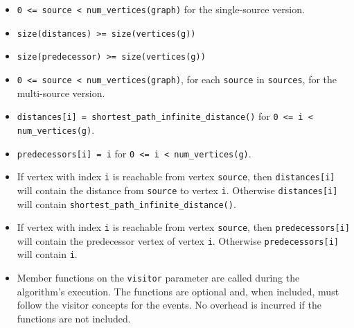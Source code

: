 \begin{itemdescr}
      \pnum\hardprecond
            \begin{itemize}
                  \item \lstinline{0 <= source < num_vertices(graph)} for the single-source version. 
                  \item \lstinline{size(distances) >= size(vertices(g))}
                  \item \lstinline{size(predecessor) >= size(vertices(g))}
            \end{itemize}
      \pnum\preconditions
            \begin{itemize}
                  \item
                        \lstinline{0 <= source < num_vertices(graph)}, for each \lstinline{source} in \lstinline{sources}, 
                        for the multi-source version.
                  \item
                        \lstinline{distances[i] = shortest_path_infinite_distance()} for \lstinline{0 <= i < num_vertices(g)}.
                  \item
                        \lstinline{predecessors[i] = i} for \lstinline{0 <= i < num_vertices(g)}.
            \end{itemize}
      \pnum\effects
            \begin{itemize}
                  \item
                        If vertex with index \lstinline{i} is reachable from vertex \lstinline{source}, then
                        \lstinline{distances[i]} will contain the distance from \lstinline{source} to vertex
                        \lstinline{i}.  Otherwise \lstinline{distances[i]} will contain
                        \lstinline{shortest_path_infinite_distance()}.
                  \item
                        If vertex with index \lstinline{i} is reachable
                        from vertex \lstinline{source}, then \lstinline{predecessors[i]} will contain the
                        predecessor vertex of vertex \lstinline{i}. Otherwise \lstinline{predecessors[i]} will contain
                        \lstinline{i}.
                  \item Member functions on the \lstinline{visitor} parameter are called during the algorithm's execution.
                        The functions are optional and, when included, must follow the visitor concepts for the events.
                        No overhead is incurred if the functions are not included.

\end{itemize}
\end{itemdescr}
